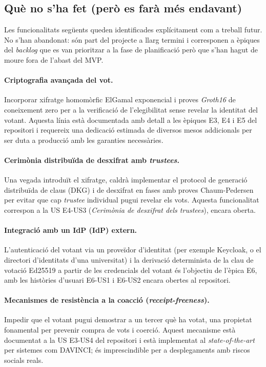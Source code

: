 \subsection{Què no s'ha fet (però es farà més endavant)}

Les funcionalitats següents queden identificades explícitament com a
treball futur. No s'han abandonat: són part del projecte a llarg
termini i corresponen a èpiques del \emph{backlog} que es van
prioritzar a la fase de planificació però que s'han hagut de moure
fora de l'abast del \ac{MVP}.

\paragraph{Criptografia avançada del vot.} Incorporar xifratge
homomòrfic ElGamal exponencial \cite{adida2008helios} i proves
\emph{Groth16} de coneixement zero \cite{cortier2019belenios} per a la
verificació de l'elegibilitat sense revelar la identitat del votant.
Aquesta línia està documentada amb detall a les èpiques E3, E4 i E5
del repositori \cite{demochainrepo} i requereix una dedicació
estimada de diversos mesos addicionals per ser duta a producció amb
les garanties necessàries.

\paragraph{Cerimònia distribuïda de desxifrat amb \emph{trustees}.}
Una vegada introduït el xifratge, caldrà implementar el protocol de
generació distribuïda de claus (DKG) i de desxifrat en fases amb
proves Chaum-Pedersen per evitar que cap \emph{trustee} individual
pugui revelar els vots. Aquesta funcionalitat correspon a la
\ac{US} E4-US3 (\emph{Cerimònia de desxifrat dels trustees}), encara
oberta.

\paragraph{Integració amb un \acl{IdP} (\ac{IdP}) extern.}
L'autenticació del votant via un proveïdor d'identitat (per exemple
Keycloak, o el directori d'identitats d'una universitat) i la
derivació determinista de la clau de votació Ed25519 a partir de
les credencials del votant és l'objectiu de l'èpica E6, amb les
històries d'usuari E6-US1 i E6-US2 encara obertes al repositori.

\paragraph{Mecanismes de resistència a la coacció
(\emph{receipt-freeness}).} Impedir que el votant pugui demostrar a un
tercer què ha votat, una propietat fonamental per prevenir compra de
vots i coerció. Aquest mecanisme està documentat a la \ac{US} E3-US4
del repositori \cite{demochainrepo} i està implementat al
\emph{state-of-the-art} per sistemes com DAVINCI; és imprescindible
per a desplegaments amb riscos socials reals.

